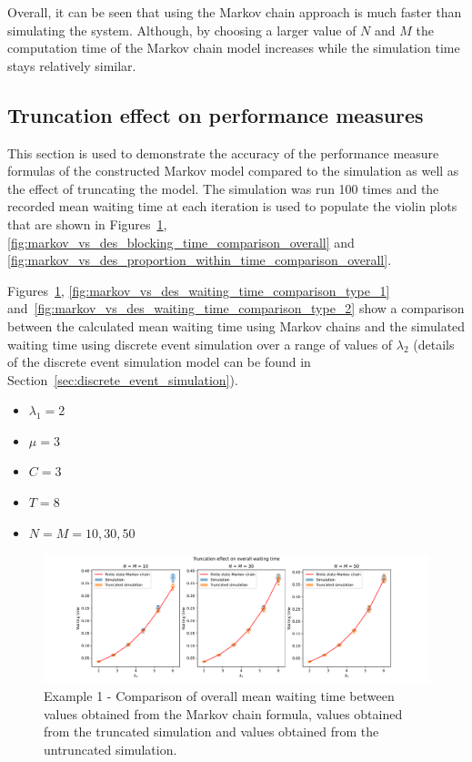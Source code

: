 Overall, it can be seen that using the Markov chain approach is much faster than
simulating the system.
Although, by choosing a larger value of \(N\) and \(M\) the computation time of
the Markov chain model increases while the simulation time stays relatively
similar.

\subsection{Truncation effect on performance measures}
\label{sec:truncation_effect_performance_measures}

This section is used to demonstrate the accuracy of the performance measure
formulas of the constructed Markov model compared to the simulation as well as
the effect of truncating the model.
The simulation was run 100 times and the recorded mean waiting time at each
iteration is used to populate the violin plots that are shown in
Figures~\ref{fig:markov_vs_des_waiting_time_comparison_overall},
\ref{fig:markov_vs_des_blocking_time_comparison_overall} and
\ref{fig:markov_vs_des_proportion_within_time_comparison_overall}.

Figures~\ref{fig:markov_vs_des_waiting_time_comparison_overall},
\ref{fig:markov_vs_des_waiting_time_comparison_type_1}
and~\ref{fig:markov_vs_des_waiting_time_comparison_type_2} show a
comparison between the calculated mean waiting time using Markov chains and the
simulated waiting time using discrete event simulation over a range of values of
\(\lambda_2\) (details of the discrete event simulation model can be found in
Section~\ref{sec:discrete_event_simulation}).

\begin{itemize}
    \item \(\lambda_1 = 2\)
    \item \(\mu = 3\)
    \item \(C = 3\)
    \item \(T = 8\)
    \item \(N = M = 10, 30, 50\)
\end{itemize}

\begin{figure}[H]
    \includegraphics[width=\textwidth]{chapters/03_queueing_model/Bin/numeric_results_and_timings/truncation_effect/waiting_time_overall.pdf}
    \caption{
        Example 1 - Comparison of overall mean waiting time between values
        obtained from the
        Markov chain formula, values obtained from the truncated simulation and
        values obtained from the untruncated simulation.
    }
    \label{fig:markov_vs_des_waiting_time_comparison_overall}
\end{figure}

